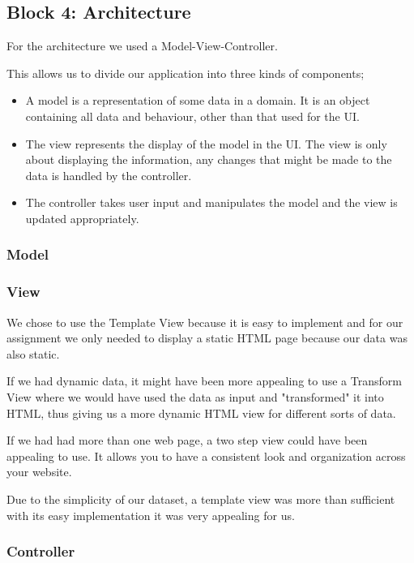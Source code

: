 \subsection{Block 4: Architecture}

For the architecture we used a Model-View-Controller.

This allows us to divide our application into three kinds of components;

\begin{itemize}
\item A model is a representation of some data in a domain. It is an object containing all data and behaviour, other than that used for the UI. 
\item The view represents the display of the model in the UI. The view is only about displaying the information, any changes that might be made to the data is handled by the controller. 
\item The controller takes user input and manipulates the model and the view is updated appropriately. 
\end{itemize}

\subsubsection*{Model}

\subsubsection*{View}
We chose to use the Template View because it is easy to implement and for our assignment we only needed to display a static HTML page because our data was also static.

If we had dynamic data, it might have been more appealing to use a Transform View where we would have used the data as input and "transformed" it into HTML, thus giving us a more dynamic HTML view for different sorts of data.

If we had had more than one web page, a two step view could have been appealing to use. It allows you to have a consistent look and organization across your website. 

Due to the simplicity of our dataset, a template view was more than sufficient with its easy implementation it was very appealing for us. 

\subsubsection*{Controller}


